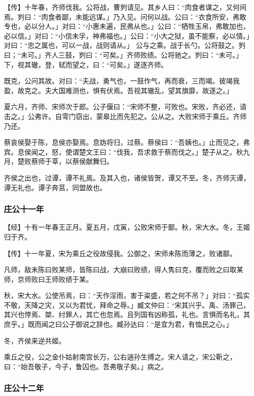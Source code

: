 \documentclass[]{article}
\begin{document}
【传】十年春，齐师伐我。公将战，曹刿请见。其乡人曰：``肉食者谋之，又何间焉。刿曰：``肉食者鄙，未能远谋。」乃入见。问何以战。公曰：``衣食所安，弗敢专也，必以分人。」对曰：``小惠未遍，民弗从也。」公曰：``牺牲玉帛，弗敢加也，必以信。」对曰：``小信未孚，神弗福也。」公曰：``小大之狱，虽不能察，必以情。」对曰：``忠之属也，可以一战，战则请从。」
公与之乘。战于长勺。公将鼓之。刿曰；``未可。」齐人三鼓，刿曰：``可矣。」齐师败绩。公将驰之。刿曰：``未可。」下，视其辙，登，轼而望之，曰：``可矣。」遂逐齐师。

既克，公问其故。对曰：``夫战，勇气也，一鼓作气，再而衰，三而竭。彼竭我盈，故克之。夫大国难测也，惧有伏焉。吾视其辙乱，望其旗靡，故逐之。」

夏六月，齐师、宋师次于郎。公子偃曰：``宋师不整，可败也。宋败，齐必还，请击之。」公弗许。自雩门窃出，蒙皋比而先犯之。公从之。大败宋师于乘丘。齐师乃还。

蔡哀侯娶于陈，息侯亦娶焉。息妫将归，过蔡。蔡侯曰：``吾姨也。」止而见之，弗宾。息侯闻之，怒，使谓楚文王曰：``伐我，吾求救于蔡而伐之。」楚子从之。秋九月，楚败蔡师于莘，以蔡侯献舞归。

齐侯之出也，过谭，谭不礼焉。及其入也，诸侯皆贺，谭又不至。冬，齐师灭谭，谭无礼也。谭子奔莒，同盟故也。

\hypertarget{header-n432}{%
\subsubsection{庄公十一年}\label{header-n432}}

【经】十有一年春王正月。夏五月，戊寅，公败宋师于鄑。秋，宋大水。冬，王姬归于齐。

【传】十一年夏，宋为乘丘之役故侵我。公御之，宋师未陈而薄之，败诸鄑。

凡师，敌未陈曰败某师，皆陈曰战，大崩曰败绩，得人隽曰克，覆而败之曰取某师，京师败曰王师败绩于某。

秋，宋大水。公使吊焉，曰：``天作淫雨，害于粢盛，若之何不吊？」对曰：``孤实不敬，天降之灾，又以为君忧，拜命之辱。」臧文仲曰：``宋其兴乎。禹、汤罪己，其兴也悖焉、桀、纣罪人，其亡也忽焉。且列国有凶称孤，礼也。言惧而名礼，其庶乎。」既而闻之曰公子御说之辞也。臧孙达曰：``是宜为君，有恤民之心。」

冬，齐侯来逆共姬。

乘丘之役，公之金仆姑射南宫长万，公右遄孙生搏之。宋人请之，宋公靳之，曰：``始吾敬子，今子，鲁囚也。吾弗敬子矣。」病之。

\hypertarget{header-n441}{%
\subsubsection{庄公十二年}\label{header-n441}}
\end{document}
